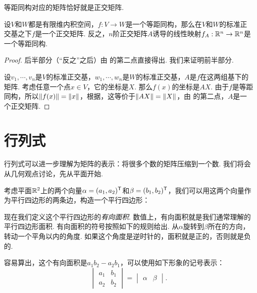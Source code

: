 等距同构对应的矩阵恰好就是正交矩阵. 
\begin{theorem}\label{thm:isometry-matrix}
设$V$和$W$都是有限维内积空间，$f:V\to W$是一个等距同构，那么在$V$和$W$的标准正交基之下$f$是一个正交矩阵. 反之，$n$阶正交矩阵$A$诱导的线性映射$f_A:\mathbb{R}^n\to\mathbb{R}^n$是一个等距同构. 
\end{theorem}
\begin{proof}
    后半部分（“反之”之后）由 的第二点直接得出. 我们来证明前半部分. 
    
    设$v_1,\cdots,v_n$是$V$的标准正交基，$w_1,\cdots,w_n$是$W$的标准正交基，$A$是$f$在这两组基下的矩阵. 考虑任意一个点$x\in V$，它的坐标是$X$. 那么$f(x)$的坐标是$AX$. 由于$f$是等距同构，所以$\left\|f(x)\right\|=\left\|x\right\|$，根据，这等价于$\left\|AX\right\|=\left\|X\right\|$，由 的第二点，$A$是一个正交矩阵. 
\end{proof}

\section{行列式}\label{sec:determinant}

行列式可以进一步理解为矩阵的表示：将很多个数的矩阵压缩到一个数. 我们将会从几何观点讨论，先从平面开始.  

考虑平面$\mathbb{R}^2$上的两个向量$\alpha=(a_1,a_2)^{\mathsf{T}}$和$\beta=(b_1,b_2)^{\mathsf{T}}$，我们可以用这两个向量作为平行四边形的两条边，构造一个平行四边形：
\begin{center}
\end{center}

现在我们定义这个平行四边形的\emph{有向面积}. 数值上，有向面积就是我们通常理解的平行四边形面积. 有向面积的符号按照如下的规则给出. 从$\alpha$旋转到$\beta$所在的方向，转动一个平角以内的角度. 如果这个角度是逆时针的，面积就是正的，否则就是负的. 

容易算出，这个有向面积是$a_1b_2-a_2b_1$，可以使用如下形象的记号表示：
\[\begin{vmatrix}
    a_1 & b_1 \\
    a_2 & b_2
\end{vmatrix}=
\begin{vmatrix}
    \alpha & \beta
\end{vmatrix}.\]


